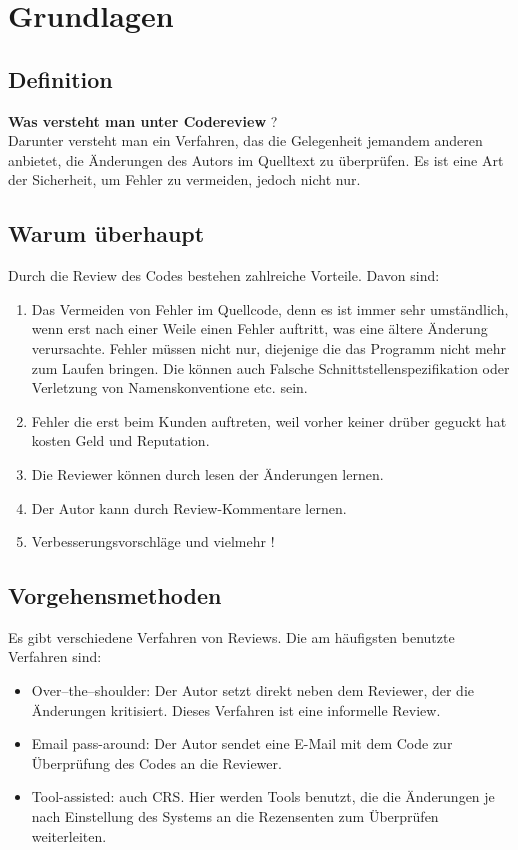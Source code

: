 \section{Grundlagen}
\label{sec:Grundlagen}

\subsection{Definition}
\label{subsec:Definition}
\textbf{Was versteht man unter Codereview} ?\\
Darunter versteht man ein Verfahren, das die Gelegenheit jemandem anderen anbietet, die Änderungen des Autors im Quelltext zu überprüfen.
Es ist eine Art der Sicherheit, um Fehler zu vermeiden, jedoch nicht nur.

\subsection{Warum überhaupt}
\label{subsec:Gründe}
Durch die Review des Codes bestehen zahlreiche Vorteile. Davon sind:

\begin{enumerate}
	\item Das Vermeiden von Fehler im Quellcode, denn es ist immer sehr umständlich, wenn erst nach einer Weile einen Fehler auftritt, was eine ältere Änderung verursachte.
		Fehler müssen nicht nur, diejenige die das Programm nicht mehr zum Laufen bringen. Die können auch Falsche Schnittstellenspezifikation oder Verletzung von Namenskonventione 
		etc. sein.
	\item Fehler die erst beim Kunden auftreten, weil vorher keiner drüber geguckt hat kosten Geld und Reputation.
	\item Die Reviewer können durch lesen der Änderungen lernen.
	\item Der Autor kann durch Review-Kommentare lernen.
	\item Verbesserungsvorschläge und vielmehr !
\end{enumerate}

\subsection{Vorgehensmethoden}
\label{subsec:Vorgehensmethoden}
Es gibt verschiedene Verfahren von Reviews. Die am häufigsten benutzte Verfahren sind:

\begin{itemize}
	\item Over–the–shoulder: Der Autor setzt direkt neben dem Reviewer, der die Änderungen kritisiert. Dieses Verfahren ist eine informelle Review.
	\item Email pass-around: Der Autor sendet eine E-Mail mit dem Code zur Überprüfung des Codes an die Reviewer.
	\item Tool-assisted: auch \ac{CRS}. Hier werden Tools benutzt, die die Änderungen je nach Einstellung des Systems an die Rezensenten zum Überprüfen weiterleiten.
\end{itemize}
